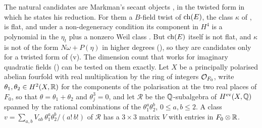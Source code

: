The natural candidates are Markman's secant objects \cite{Mar25c}, in the
twisted form in which he states his reduction. For them a $B$-field twist of
$\operatorname{ch}(E)$, the class $\kappa$ of , is flat, and
under a non-degeneracy condition its component in $H^{4}$ is a polynomial in
the $\eta_{t}$ plus a nonzero Weil class
\cite[Proposition~10.2.1, Theorem~1.1.2]{Mar25c}. But $\operatorname{ch}(E)$ itself is not
flat, and $\kappa$ is not of the form $N\omega+P(\eta)$ in higher degrees
(), so they are candidates only for a twisted
form of (v). The dimension count that works for
imaginary quadratic fields () can be tested on them
exactly. Let $X$ be a principally polarised abelian fourfold with real
multiplication by the ring of integers $\mathcal{O}_{F_{0}}$, write
$\theta_{1},\theta_{2}\in H^{2}(X,\mathbb{R})$ for the components of the
polarisation at the two real places of $F_{0}$, so that
$\theta=\theta_{1}+\theta_{2}$ and $\theta_{j}^{3}=0$, and let $\mathcal{R}$ be
the $\mathbb{Q}$-subalgebra of $H^{\mathrm{ev}}(X,\mathbb{Q})$ spanned by the rational
combinations of the $\theta_{1}^{a}\theta_{2}^{b}$, $0\le a,b\le2$. A class
$v=\sum_{a,b}V_{ab}\,\theta_{1}^{a}\theta_{2}^{b}/(a!\,b!)$ of $\mathcal{R}$ has a
$3\times3$ matrix $V$ with entries in $F_{0}\otimes\mathbb{R}$.

